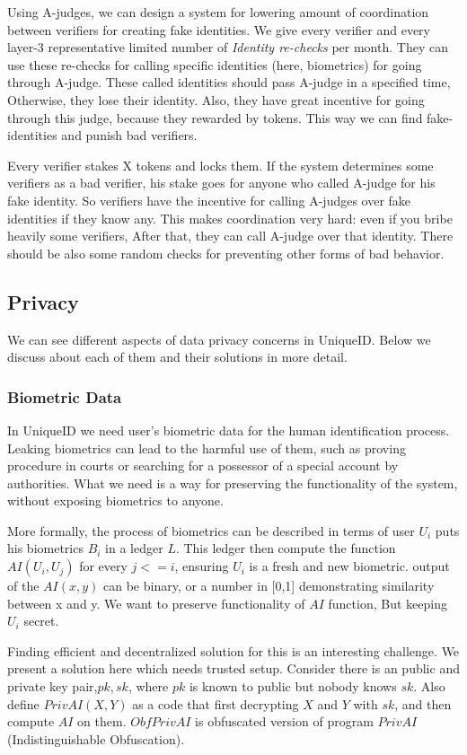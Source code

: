 \documentclass[conference]{IEEEtran}
\begin{document}
Using A-judges, we can design a system for lowering amount of coordination between verifiers for creating fake identities. We give every verifier and every layer-3 representative limited number of \textit{Identity re-checks} per month. They can use these re-checks for calling specific identities (here, biometrics) for     going through A-judge. These called identities should pass A-judge in a specified time, Otherwise, they lose their identity. Also, they have great incentive for going through this judge, because they rewarded by tokens. This way we can find fake-identities and punish bad verifiers.


Every verifier stakes X tokens and locks them. If the system determines some verifiers as a bad verifier, his stake goes for anyone who called A-judge for his fake identity. So verifiers have the incentive for calling A-judges over fake identities if they know any. This makes coordination very hard: even if you bribe heavily some verifiers, After that, they can call A-judge over that identity. There should be also some random checks for preventing other forms of bad behavior.

\subsection{Privacy}
We can see different aspects of data privacy concerns in UniqueID. Below we discuss about each of them and their solutions in more detail.


\subsubsection*{Biometric Data}
In UniqueID we need user's biometric data for the human identification process. Leaking biometrics can lead to the harmful use of them, such as proving procedure in courts or searching for a possessor of a special account by authorities. What we need is a way for preserving the functionality of the system, without exposing biometrics to anyone.


More formally, the process of biometrics can be described in terms of user $U_i$ puts his biometrics $B_i$ in a ledger $L$. This ledger then compute the function $AI(U_i,U_j)$ for every $j <= i$, ensuring $U_i$ is a fresh and new biometric. output of the $AI(x,y)$ can be binary, or a number in [0,1] demonstrating similarity between x and y. We want to preserve functionality of $AI$ function, But keeping $U_i$ secret. 

Finding efficient and decentralized solution for this is an interesting challenge. We present a solution here which needs trusted setup. Consider there is an public and private key pair,$pk,sk$, where $pk$ is known to public but nobody knows $sk$. Also define $PrivAI(X,Y)$ as a code that first decrypting $X$ and $Y$ with $sk$, and then compute $AI$ on them. $ObfPrivAI$ is obfuscated version of program $PrivAI$ (Indistinguishable Obfuscation). 
\end{document}
